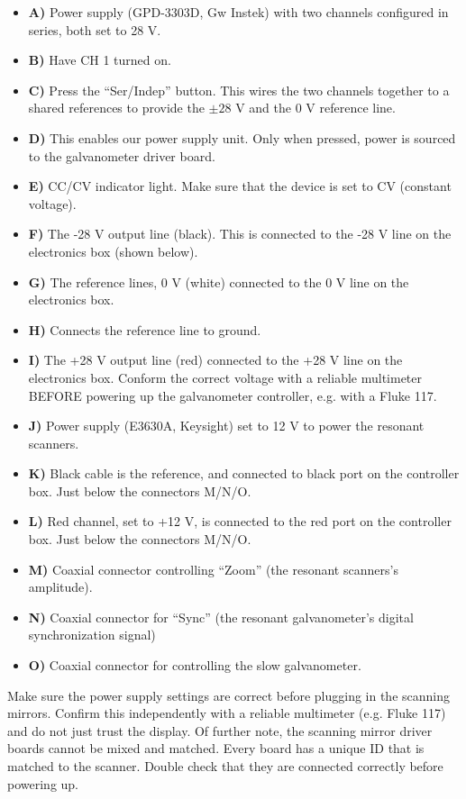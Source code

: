 \documentclass[10pt,letterpaper]{article}
\begin{document}
\begin{itemize}
    \item \textbf{A)} Power supply (GPD-3303D, Gw Instek) with two channels configured in series, both set to 28 V.
    \item \textbf{B)} Have CH 1 turned on.
    \item \textbf{C)} Press the ``Ser/Indep'' button. This wires the two channels together to a shared references to provide the $\pm 28\text{ V}$ and the 0 V reference line.
    \item \textbf{D)} This enables our power supply unit. Only when pressed, power is sourced to the galvanometer driver board.
    \item \textbf{E)} CC/CV indicator light. Make sure that the device is set to CV (constant voltage).
    \item \textbf{F)} The -28 V output line (black). This is connected to the -28 V line on the electronics box (shown below).
    \item \textbf{G)} The reference lines, 0 V (white) connected to the 0 V line on the electronics box.
    \item \textbf{H)} Connects the reference line to ground.
    \item \textbf{I)} The +28 V output line (red) connected to the +28 V line on the electronics box. Conform the correct voltage with a reliable multimeter BEFORE powering up the galvanometer controller, e.g. with a Fluke 117.
    \item \textbf{J)} Power supply (E3630A, Keysight) set to 12 V to power the resonant scanners.
    \item \textbf{K)} Black cable is the reference, and connected to black port on the controller box. Just below the connectors M/N/O.
    \item \textbf{L)} Red channel, set to +12 V, is connected to the red port on the controller box. Just below the connectors M/N/O.
    \item \textbf{M)} Coaxial connector controlling ``Zoom'' (the resonant scanners's amplitude).
    \item \textbf{N)} Coaxial connector for ``Sync'' (the resonant galvanometer's digital synchronization signal)
    \item \textbf{O)} Coaxial connector for controlling the slow galvanometer.
\end{itemize}
Make sure the power supply settings are correct before plugging in the scanning mirrors. Confirm this independently with a reliable multimeter (e.g. Fluke 117) and do not just trust the display. Of further note, the scanning mirror driver boards cannot be mixed and matched. Every board has a unique ID that is matched to the scanner. Double check that they are connected correctly before powering up.
\end{document}
